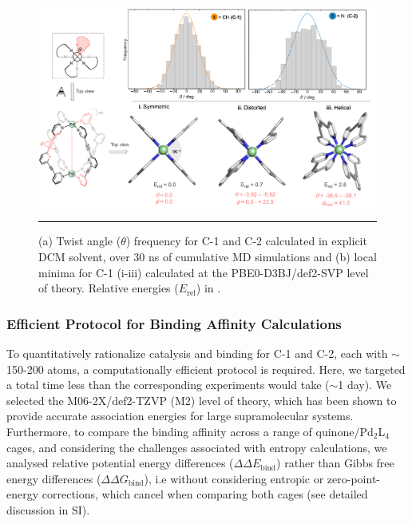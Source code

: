 \documentclass[../../main.tex]{subfiles}
\begin{document}
\begin{figure}[h!]
	\vspace{0.4cm}
	\centering
	\includegraphics[width=\textwidth]{3/da/figs/fig2/fig2}
	\vspace{0.2cm}
	\hrule
	\caption{(a) Twist angle ($\theta$) frequency for C-1 and C-2 calculated in explicit DCM solvent, over 30 ns of cumulative MD simulations and (b) local minima for C-1 (i-iii) calculated at the PBE0-D3BJ/def2-SVP level of theory. Relative energies ($E_\text{rel}$) in \kcal.}
	\label{fig::da_2}
\end{figure}

\subsubsection{Efficient Protocol for Binding Affinity Calculations}

To quantitatively rationalize catalysis and binding for C-1 and C-2, each with $\sim$150-200 atoms, a computationally efficient protocol is required. Here, we targeted a total time less than the corresponding experiments would take ($\sim$1 day). We selected the M06-2X/def2-TZVP (M2) level of theory, which has been shown to provide accurate association energies for large supramolecular systems.\cite{Sure2015} Furthermore, to compare the binding affinity across a range of quinone/Pd${}_2$L${}_4$ cages, and considering the challenges associated with entropy calculations,\cite{Bootsma2019, Grimme2012, Caldararu2016} we analysed relative potential energy differences ($\Delta\Delta E_\text{bind}$) rather than Gibbs free energy differences ($\Delta\Delta G_\text{bind}$), i.e without considering entropic or zero-point-energy corrections, which cancel when comparing both cages (see detailed discussion in SI).
\end{document}
